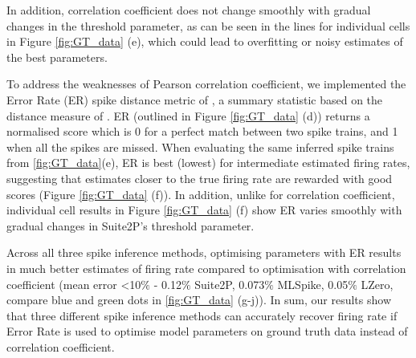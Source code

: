 \documentclass[a4paper,10pt,twocolumn]{article}
\begin{document}
In addition, correlation coefficient does not change smoothly with gradual changes in the threshold parameter, as can be seen in the lines for individual cells in Figure \ref{fig:GT_data} (e), which could lead to overfitting or noisy estimates of the best parameters. 

To address the weaknesses of Pearson correlation coefficient, we implemented the Error Rate (ER) spike distance metric of \citet{Deneux2016-gu}, a summary statistic based on the distance measure of \cite{Victor1996-cg}. ER (outlined in Figure \ref{fig:GT_data} (d)) returns a normalised score which is 0 for a perfect match between two spike trains, and 1 when all the spikes are missed. When evaluating the same inferred spike trains from \ref{fig:GT_data}(e), ER is best (lowest) for intermediate estimated firing rates, suggesting that estimates closer to the true firing rate are rewarded with good scores (Figure \ref{fig:GT_data} (f)). In addition, unlike for correlation coefficient, individual cell results in Figure \ref{fig:GT_data} (f) show ER varies smoothly with gradual changes in Suite2P's threshold parameter. 


Across all three spike inference methods, optimising parameters with ER results in much better estimates of firing rate compared to optimisation with correlation coefficient  (mean error <10$\%$ - 0.12$\%$ Suite2P, 0.073$\%$ MLSpike, 0.05$\%$ LZero, compare blue and green dots in \ref{fig:GT_data} (g-j)). 
In sum, our results show that three different spike inference methods can accurately recover firing rate if Error Rate is used to optimise model parameters on ground truth data instead of correlation coefficient. 

\end{document}
